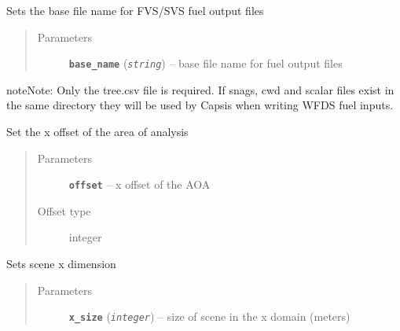 \documentclass[letterpaper,10pt,english]{sphinxmanual}
\begin{document}
\begin{fulllineitems}

\begin{fulllineitems}
\label{capsis_RunConfig:capsis.RunConfig.set_svs_base}
Sets the base file name for FVS/SVS fuel output files
\begin{quote}\begin{description}
\item[{Parameters}] \leavevmode
\textbf{\texttt{base\_name}} (\emph{\texttt{string}}) -- base file name for fuel output files

\end{description}\end{quote}

\begin{notice}{note}{Note:}
Only the tree.csv file is required. If snags, cwd and scalar
files exist in the same directory they will be used by
Capsis when writing WFDS fuel inputs.
\end{notice}

\end{fulllineitems}


\begin{fulllineitems}
\label{capsis_RunConfig:capsis.RunConfig.set_x_offset}
Set the x offset of the area of analysis
\begin{quote}\begin{description}
\item[{Parameters}] \leavevmode
\textbf{\texttt{offset}} -- x offset of the AOA

\item[{Offset type}] \leavevmode
integer

\end{description}\end{quote}

\end{fulllineitems}


\begin{fulllineitems}
\label{capsis_RunConfig:capsis.RunConfig.set_x_size}
Sets scene x dimension
\begin{quote}\begin{description}
\item[{Parameters}] \leavevmode
\textbf{\texttt{x\_size}} (\emph{\texttt{integer}}) -- size of scene in the x domain (meters)


\end{description}
\end{quote}
\end{fulllineitems}
\end{fulllineitems}
\end{document}
